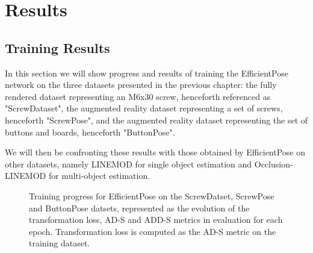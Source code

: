 \chapter{Results}

\section{Training Results}

In this section we will show progress and results of training the EfficientPose network on the three datasets presented in the previous chapter: the fully rendered dataset representing an M6x30 screw, henceforth referenced as "ScrewDataset", the augmented reality dataset representing a set of screws, henceforth "ScrewPose", and the augmented reality dataset representing the set of buttons and boards, henceforth "ButtonPose".

We will then be confronting these results with those obtained by EfficientPose on other datasets, namely LINEMOD for single object estimation and Occlusion-LINEMOD for multi-object estimation.

\begin{figure}[htp]



    \caption{Training progress for EfficientPose on the ScrewDatset, ScrewPose and ButtonPose datsets, represented as the evolution of the transformation loss, AD-S and ADD-S metrics in evaluation for each epoch. Transformation loss is computed as the AD-S metric on the training dataset.}
\end{figure}

